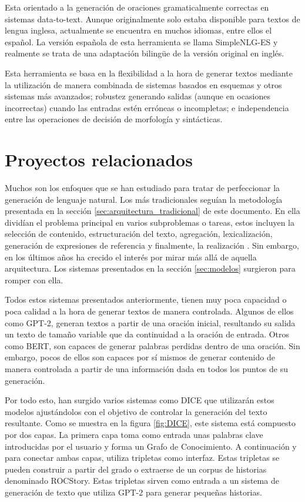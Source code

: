 Esta orientado a la generación de oraciones gramaticalmente correctas en sistemas data-to-text. Aunque originalmente solo estaba disponible para textos de lengua inglesa, actualmente se encuentra en muchos idiomas, entre ellos el español. La versión española de esta herramienta se llama SimpleNLG-ES y realmente se trata de una adaptación bilingüe de la versión original en inglés.

Esta herramienta se basa en la flexibilidad a la hora de generar textos mediante la utilización de manera combinada de sistemas basados en esquemas y otros sistemas más avanzados; robustez generando salidas (aunque en ocasiones incorrectas) cuando las entradas estén erróneas o incompletas; e independencia entre las operaciones de decisión de morfología y sintácticas.

\section{Proyectos relacionados}
Muchos son los enfoques que se han estudiado para tratar de perfeccionar la generación de lenguaje natural. Los más tradicionales seguían la metodología presentada en la sección \ref{sec:arquitectura_tradicional} de este documento. En ella dividían el problema principal en varios subproblemas o tareas, estos incluyen la selección de contenido, estructuración del texto, agregación, lexicalización, generación de expresiones de referencia y finalmente, la realización \citep{reiter1997building}. Sin embargo, en los últimos años ha crecido el interés por mirar más allá de aquella arquitectura. Los sistemas presentados en la sección \ref{sec:modelos} surgieron para romper con ella.

Todos estos sistemas presentados anteriormente, tienen muy poca capacidad o poca calidad a la hora de generar textos de manera controlada. Algunos de ellos como GPT-2, generan textos a partir de una oración inicial, resultando su salida un texto de tamaño variable que da continuidad a la oración de entrada. Otros como BERT, son capaces de generar palabras perdidas dentro de una oración. Sin embargo, pocos de ellos son capaces por sí mismos de generar contenido de manera controlada a partir de una información dada en todos los puntos de su generación.

 
Por todo esto, han surgido varios sistemas como DICE \citep{yang2020creative} que utilizarán estos modelos ajustándolos con el objetivo de controlar la generación del texto resultante. Como se muestra en la figura \ref{fig:DICE}, este sistema está compuesto por dos capas. La primera capa toma como entrada unas palabras clave introducidas por el usuario y forma un Grafo de Conocimiento. A continuación y para conectar ambas capas, utiliza tripletas como interfaz. Estas tripletas se pueden construir a partir del grado o extraerse de un corpus de historias denominado ROCStory. Estas tripletas sirven como entrada a un sistema de generación de texto que utiliza GPT-2 para generar pequeñas historias.

